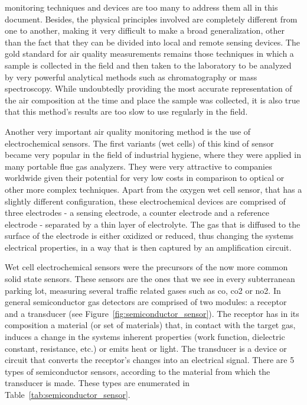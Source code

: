  monitoring techniques and devices are too many to address
them all in this document. Besides, the physical principles involved are
completely different from one to another, making it very difficult to
make a broad generalization, other than the fact that they can be
divided into local and remote sensing devices. The gold standard for air
quality measurements remains those techniques in which a sample is
collected in the field and then taken to the laboratory to be analyzed
by very powerful analytical methods such as chromatography or mass
spectroscopy. While undoubtedly providing the most accurate
representation of the air composition at the time and place the sample
was collected, it is also true that this method's results are too slow
to use regularly in the field.

Another very important air quality monitoring method is the use of
electrochemical sensors. The first variants (wet cells) of this kind of
sensor became very popular in the field of industrial hygiene, where
they were applied in many portable flue gas analyzers. They were very
attractive to companies worldwide given their potential for very low
costs in comparison to optical or other more complex techniques. Apart
from the oxygen wet cell sensor, that has a slightly different
configuration, these electrochemical devices are comprised of three
electrodes - a sensing electrode, a counter electrode and a reference
electrode - separated by a thin layer of electrolyte. The gas that is
diffused to the surface of the electrode is either oxidized or reduced,
thus changing the systems electrical properties, in a way that is then
captured by an amplification circuit.

Wet cell electrochemical sensors were the precursors of the now more
common solid state sensors. These sensors are the ones that we see in
every subterranean parking lot, measuring several traffic related gases
such as \gls{co}, \gls{co2} or \gls{no2}. In general semiconductor gas
detectors are comprised of two modules: a receptor and a transducer (see
Figure~\ref{fig:semiconductor_sensor}). The receptor has in its
composition a material (or set of materials) that, in contact with the
target gas, induces a change in the systems inherent properties (work
function, dielectric constant, resistance, etc.) or emits heat or light.
The transducer is a device or circuit that converts the receptor's
changes into an electrical signal. There are 5 types of semiconductor
sensors, according to the material from which the transducer is made.
These types are enumerated in Table~\ref{tab:semiconductor_sensor}.

